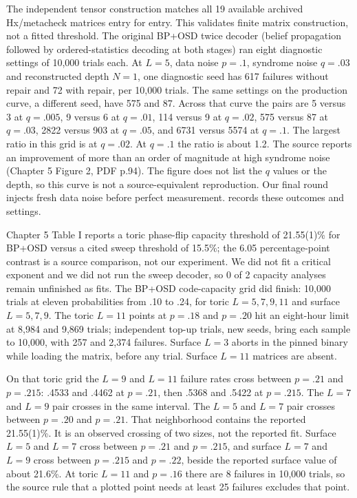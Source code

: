 The independent tensor construction matches all 19 available archived Hx/metacheck matrices entry for entry. This validates finite matrix construction, not a fitted threshold. The original BP+OSD twice decoder (belief propagation followed by ordered-statistics decoding at both stages) ran eight diagnostic settings of 10,000 trials each. At $L=5$, data noise $p=.1$, syndrome noise $q=.03$ and reconstructed depth $N=1$, one diagnostic seed has 617 failures without repair and 72 with repair, per 10,000 trials. The same settings on the production curve, a different seed, have 575 and 87. Across that curve the pairs are 5 versus 3 at $q=.005$, 9 versus 6 at $q=.01$, 114 versus 9 at $q=.02$, 575 versus 87 at $q=.03$, 2822 versus 903 at $q=.05$, and 6731 versus 5574 at $q=.1$. The largest ratio in this grid is at $q=.02$. At $q=.1$ the ratio is about 1.2. The source reports an improvement of more than an order of magnitude at high syndrome noise (Chapter 5 Figure 2, PDF p.94). The figure does not list the $q$ values or the depth, so this curve is not a source-equivalent reproduction. Our final round injects fresh data noise before perfect measurement. \href{https://github.com/alectionary/vibe-math/blob/master/formalization/quintavalle-hgp/results/original_diagnostic_grid.json}{} records these outcomes and settings.

Chapter 5 Table I reports a toric phase-flip capacity threshold of 21.55(1)\% for BP+OSD versus a cited sweep threshold of 15.5\%; the 6.05 percentage-point contrast is a source comparison, not our experiment. We did not fit a critical exponent and we did not run the sweep decoder, so 0 of 2 capacity analyses remain unfinished as fits. The BP+OSD code-capacity grid did finish: 10,000 trials at eleven probabilities from .10 to .24, for toric $L=5,7,9,11$ and surface $L=5,7,9$. The toric $L=11$ points at $p=.18$ and $p=.20$ hit an eight-hour limit at 8,984 and 9,869 trials; independent top-up trials, new seeds, bring each sample to 10,000, with 257 and 2,374 failures. Surface $L=3$ aborts in the pinned binary while loading the matrix, before any trial. Surface $L=11$ matrices are absent.

On that toric grid the $L=9$ and $L=11$ failure rates cross between $p=.21$ and $p=.215$: .4533 and .4462 at $p=.21$, then .5368 and .5422 at $p=.215$. The $L=7$ and $L=9$ pair crosses in the same interval. The $L=5$ and $L=7$ pair crosses between $p=.20$ and $p=.21$. That neighborhood contains the reported 21.55(1)\%. It is an observed crossing of two sizes, not the reported fit. Surface $L=5$ and $L=7$ cross between $p=.21$ and $p=.215$, and surface $L=7$ and $L=9$ cross between $p=.215$ and $p=.22$, beside the reported surface value of about 21.6\%. At toric $L=11$ and $p=.16$ there are 8 failures in 10,000 trials, so the source rule that a plotted point needs at least 25 failures excludes that point.

